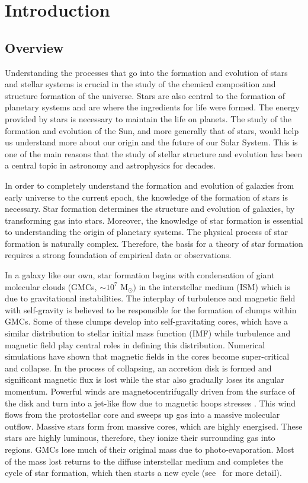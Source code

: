 \chapter{Introduction}
\label{chap:intro}

\section{Overview}
Understanding the processes that go into the formation and evolution of stars and stellar systems is crucial in the study of the chemical composition and structure formation of the universe. Stars are also central to the formation of planetary systems and are where the ingredients for life were formed. The energy provided by stars is necessary to maintain the life on planets. The study of the formation and evolution of the Sun, and more generally that of stars, would help us understand more about our origin and the future of our Solar System. This is one of the main reasons that the study of stellar structure and evolution has been a central topic in astronomy and astrophysics for decades.    
 
In order to completely understand the formation and evolution of galaxies from early universe to the current epoch, the knowledge of the formation of stars is necessary. Star formation determines the structure and evolution of galaxies, by transforming gas into stars. Moreover, the knowledge of star formation is essential to understanding the origin of planetary systems. The physical process of star formation is naturally complex. Therefore, the basis for a theory of star formation requires a strong foundation of empirical data or observations.

In a galaxy like our own, star formation begins with condensation of giant molecular clouds (GMCs, $\sim 10^7$ M$_{\odot})$ in the interstellar medium (ISM) which is due to gravitational instabilities. The interplay of turbulence and magnetic field with self-gravity is believed to be responsible for the formation of clumps within GMCs. Some of these clumps develop into self-gravitating cores, which have a similar distribution to stellar initial mass function (IMF) while turbulence and magnetic field play central roles in defining this distribution. Numerical simulations have shown that magnetic fields in the cores become super-critical and collapse\citep{Basu97}. In the process of  collapsing, an accretion disk is formed and significant magnetic flux is lost while the star also gradually loses its angular momentum. Powerful winds are magnetocentrifugally driven from the surface of the disk and turn into a jet-like flow due to magnetic hoops stresses \citep{Shu94}. This wind flows from the protostellar core and sweeps up gas into a massive molecular outflow. Massive stars form from massive cores, which are highly energised. These stars are highly luminous, therefore, they ionize their surrounding gas into \hii regions. GMCs lose much of their original mass due to photo-evaporation. Most of the mass lost returns to the diffuse interstellar medium and completes the cycle of star formation, which then starts a new cycle (see~\cite{McKee07} for more detail).  

